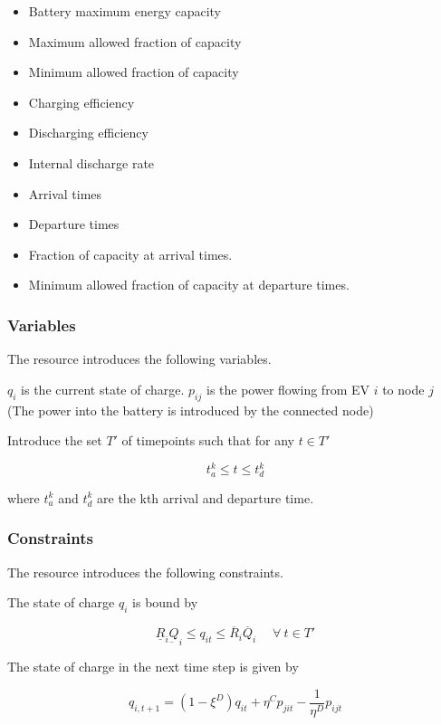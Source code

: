 \documentclass[]{report}
\newcommand{\soc}{q}
\newcommand{\socmax}{\overline{Q}}
\newcommand{\socmin}{\underbar{Q}}
\newcommand{\ub}[1]{\overline{#1}}
\newcommand{\lb}[1]{\underline{#1}}
\let\oldforall\forall
\renewcommand{\forall}{\; \oldforall \: }
\begin{document}
\begin{itemize}
    \item [$\socmax_i$] Battery maximum energy capacity
    \item [$\ub{R}$] Maximum allowed fraction of capacity
    \item [$\lb{R}$] Minimum allowed fraction of capacity
    \item [$\eta^C$] Charging efficiency
    \item [$\eta^D$] Discharging efficiency
    \item [$\xi^D$] Internal discharge rate
    \item [$t_a$] Arrival times
    \item [$t_d$] Departure times
    \item [$\lb{R}_0$] Fraction of capacity at arrival times.
    \item [$\lb{R}_A$] Minimum allowed fraction of capacity at departure times.
\end{itemize}
\subsubsection*{Variables}
The resource introduces the following variables.

$q_i$ is the current state of charge. $p_{ij}$ is the power flowing from  EV $i$ to  node $j$ (The power into the battery is introduced by the connected node)

Introduce the set $T'$ of timepoints such that for any $t \in T'$

\begin{equation}
    t_a^k\leq t \leq t_d^k
\end{equation}

where $t_a^k$ and $t_d^k$ are the kth arrival and departure time.

\subsubsection*{Constraints}
The resource introduces the following constraints.

The state of charge $q_i$ is bound by

\begin{equation}
    \lb{R}_i \socmin_i \leq \soc_{it} \leq \ub{R}_i\socmax_i  \quad \forall t \in T'
\end{equation}

The state of charge in the next time step is given by

\begin{equation}
    \soc_{i,t+1} = (1-\xi^D)\soc_{it} + \eta^C p_{jit} - \frac{1}{\eta^D}p_{ijt}
\end{equation}
\end{document}
